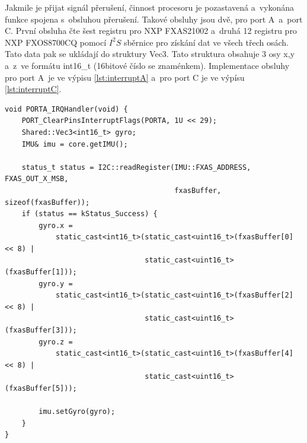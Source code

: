 Jakmile je přijat signál přerušení, činnost procesoru je pozastavená a~vykonána 
funkce spojena s~obsluhou přerušení. Takové obsluhy jsou dvě, pro port A~a~port C. 
První obsluha čte šest registru pro NXP FXAS21002 a~druhá 12 registru pro NXP 
FXOS8700CQ pomocí $I^2S$ sběrnice pro získání dat ve všech třech osách. Tato data 
pak se ukládají do struktury Vec3. Tato struktura obsahuje 3 osy x,y a~z~ve formátu 
int16\_t (16bitové číslo se znaménkem). Implementace obsluhy pro port A~je ve výpisu 
\ref{lst:interruptA} a~pro port C je ve výpísu \ref{lst:interruptC}.

\begin{lstlisting}[caption = Funkce obsluhy přerušení na portu A, label = lst:interruptA]
void PORTA_IRQHandler(void) {
    PORT_ClearPinsInterruptFlags(PORTA, 1U << 29);
    Shared::Vec3<int16_t> gyro;
    IMU& imu = core.getIMU();

    status_t status = I2C::readRegister(IMU::FXAS_ADDRESS, FXAS_OUT_X_MSB,
                                        fxasBuffer, sizeof(fxasBuffer));
    if (status == kStatus_Success) {
        gyro.x =
            static_cast<int16_t>(static_cast<uint16_t>(fxasBuffer[0] << 8) |
                                 static_cast<uint16_t>(fxasBuffer[1]));
        gyro.y =
            static_cast<int16_t>(static_cast<uint16_t>(fxasBuffer[2] << 8) |
                                 static_cast<uint16_t>(fxasBuffer[3]));
        gyro.z =
            static_cast<int16_t>(static_cast<uint16_t>(fxasBuffer[4] << 8) |
                                 static_cast<uint16_t>(fxasBuffer[5]));

        imu.setGyro(gyro);
    }
}
\end{lstlisting}


